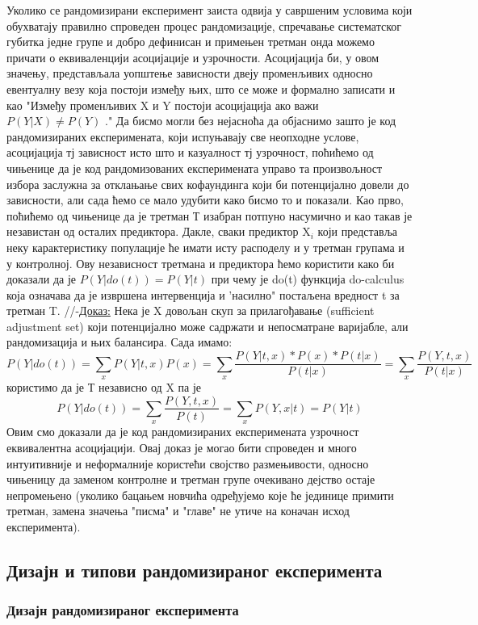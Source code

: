 \documentclass[12pt, a4paper]{article}
\begin{document}
Уколико се рандомизирани експеримент заиста одвија у савршеним условима који обухватају правилно 
спроведен процес рандомизације, спречавање систематског губитка једне групе и добро дефинисан и 
примењен третман онда можемо причати о еквиваленцији асоцијације и узрочности.
Асоцијација би, у овом значењу, представљала уопштење зависности двеју променљивих односно 
евентуалну везу која постоји између њих, што се може и формално записати и као "Између променљивих 
X и Y постоји асоцијација ако важи $P(Y|X) \neq P(Y)$ ."
Да бисмо могли без нејасноћа да објаснимо зашто је код рандомизираних експеримената, који 
испуњавају све неопходне услове, асоцијација тј зависност исто што и казуалност тј узрочност, 
поћићемо од чињенице да је код рандомизованих експеримената управо та произвољност избора 
заслужна за отклањање свих кофаундинга који би потенцијално довели до зависности, али сада ћемо 
се мало удубити како бисмо то и показали. Као прво, поћићемо од чињенице да је третман Т изабран 
потпуно насумично и као такав је независтан од осталих предиктора. Дакле, сваки предиктор X$_i$ 
који представља неку карактеристику популације ће имати исту расподелу и у третман групама и у 
контролној. Ову независност третмана и предиктора ћемо користити како би доказали да је 
$P(Y|do(t)) = P(Y|t)$ при чему је do(t) функција do-calculus која означава да је извршена 
интервенција и 'насилно" постаљена вредност t за третман T.
//-\underline{Доказ:} Нека је X довољан скуп за прилагођавање (sufficient adjustment set) који 
потенцијално може садржати и непосматране варијабле, али рандомизација и њих балансира.
Сада имамо: 
$$P(Y|do(t))=\sum_x P(Y|t,x) P(x)=\sum_x \frac{P(Y|t,x)*P(x)*P(t|x)}{P(t|x)}=
\sum_x \frac{P(Y,t,x)}{P(t|x)}$$ користимо да је Т независно од X па је 
$$P(Y|do(t))=\sum_x \frac{P(Y,t,x)}{P(t)}=\sum_x P(Y,x|t)=P(Y|t)$$
Овим смо доказали да је код рандомизираних експеримената узрочност еквивалентна асоцијацији.
Овај доказ је могао бити спроведен и много интуитивније и неформалније користећи својство 
размењивости, односно чињеницу да заменом контролне и третман групе очекивано дејство остаје 
непромењено (уколико бацањем новчића одређујемо које ће јединице примити третман, замена значења 
"писма" и "главе" не утиче на коначан исход експеримента).

\subsection{Дизајн и типови рандомизираног експеримента}

\subsubsection{Дизајн рандомизираног експеримента}
\end{document}
